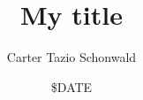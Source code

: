 \documentclass[letterpaper,twoside,reqno,openright,11pt]{memoir}
\begin{document}
\title{My title}
\author{Carter Tazio Schonwald}
\date{\${DATE}}
\frontmatter
{}

\maketitle

\begin{abstract}

\end{abstract}

\mainmatter
\end{document}
